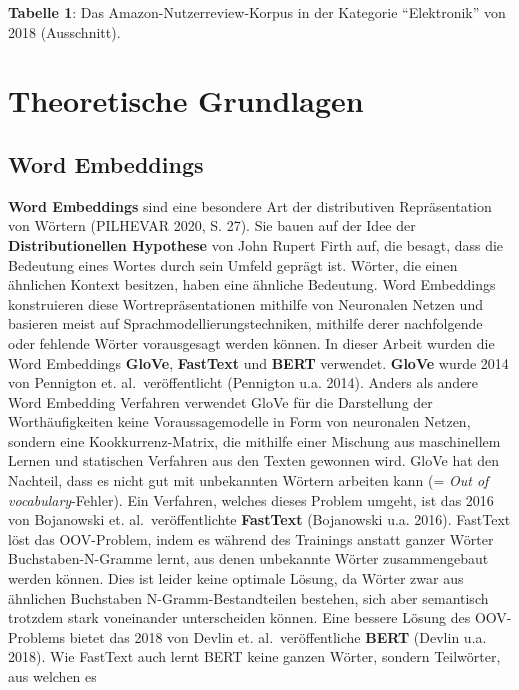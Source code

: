 \documentclass[11pt]{article}
\begin{document}
\textbf{Tabelle 1}: Das Amazon-Nutzerreview-Korpus in der Kategorie
``Elektronik'' von 2018 (Ausschnitt).

    \hypertarget{theoretische-grundlagen}{%
\section{Theoretische Grundlagen}\label{theoretische-grundlagen}}

\hypertarget{word-embeddings}{%
\subsection{Word Embeddings}\label{word-embeddings}}

\textbf{Word Embeddings} sind eine besondere Art der distributiven
Repräsentation von Wörtern (PILHEVAR 2020, S. 27). Sie bauen auf der
Idee der \textbf{Distributionellen Hypothese} von John Rupert Firth auf,
die besagt, dass die Bedeutung eines Wortes durch sein Umfeld geprägt
ist. Wörter, die einen ähnlichen Kontext besitzen, haben eine ähnliche
Bedeutung. Word Embeddings konstruieren diese Wortrepräsentationen
mithilfe von Neuronalen Netzen und basieren meist auf
Sprachmodellierungstechniken, mithilfe derer nachfolgende oder fehlende
Wörter vorausgesagt werden können. In dieser Arbeit wurden die Word
Embeddings \textbf{GloVe}, \textbf{FastText} und \textbf{BERT}
verwendet. \textbf{GloVe} wurde 2014 von Pennigton et.
al.~veröffentlicht (Pennigton u.a. 2014). Anders als andere Word
Embedding Verfahren verwendet GloVe für die Darstellung der
Worthäufigkeiten keine Voraussagemodelle in Form von neuronalen Netzen,
sondern eine Kookkurrenz-Matrix, die mithilfe einer Mischung aus
maschinellem Lernen und statischen Verfahren aus den Texten gewonnen
wird. GloVe hat den Nachteil, dass es nicht gut mit unbekannten Wörtern
arbeiten kann (= \emph{Out of vocabulary}-Fehler). Ein Verfahren,
welches dieses Problem umgeht, ist das 2016 von Bojanowski et.
al.~veröffentlichte \textbf{FastText} (Bojanowski u.a. 2016). FastText
löst das OOV-Problem, indem es während des Trainings anstatt ganzer
Wörter Buchstaben-N-Gramme lernt, aus denen unbekannte Wörter
zusammengebaut werden können. Dies ist leider keine optimale Lösung, da
Wörter zwar aus ähnlichen Buchstaben N-Gramm-Bestandteilen bestehen,
sich aber semantisch trotzdem stark voneinander unterscheiden können.
Eine bessere Lösung des OOV-Problems bietet das 2018 von Devlin et.
al.~veröffentliche \textbf{BERT} (Devlin u.a. 2018). Wie FastText auch
lernt BERT keine ganzen Wörter, sondern Teilwörter, aus welchen es
\end{document}
